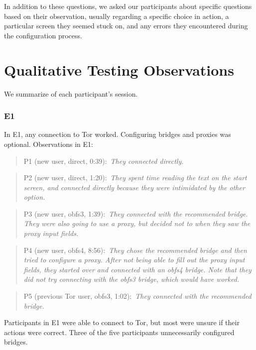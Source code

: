 \documentclass[USenglish,oneside,twocolumn]{article}
\newcommand{\pquote}[2]{
\begin{quotation}
\noindent #1:~\textit{#2}
\end{quotation}
}
\begin{document}
In addition to these questions, we asked our participants about specific questions based on their observation, usually regarding a specific choice in action, a particular screen they seemed stuck on, and any errors they encountered during the configuration process. 

\section{Qualitative Testing Observations}
\label{summary}
We summarize of each participant's session.



\subsubsection{E1} 
In E1, any connection to Tor worked. Configuring bridges and proxies was optional.  
Observations in E1: 

\pquote{P1 (new user, direct, 0:39)}{They connected directly.}

\pquote{P2 (new user, direct, 1:20)}{They spent time reading the text on the start screen, and connected directly because they were intimidated by the other option.}

\pquote{P3 (new user, obfs3, 1:39)}{They connected with the recommended bridge. They were also going to use a proxy, but decided not to when they saw the proxy input fields.}

\pquote{P4 (new user, obfs4, 8:56)}{They chose the recommended bridge and then tried to configure a proxy. After not being able to fill out the proxy input fields, they started over and connected with an obfs4 bridge. Note that they did not try connecting with the obfs3 bridge, which would have worked.}

\pquote{P5 (previous Tor user, obfs3, 1:02)}{They connected with the recommended bridge.}

Participants in E1 were able to connect to Tor, but most were unsure if their actions were correct. Three of the five participants unnecessarily configured bridges. 
\end{document}
